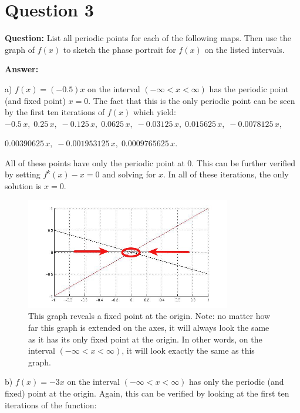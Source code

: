 \documentclass[12pt]{article}
\newenvironment{myenv}{\begin{adjustwidth}{1cm}{}}{\end{adjustwidth}}
\begin{document}
\section*{Question 3}
\begin{myenv}
\textbf{Question:} List all periodic points for each of the following maps. Then use the graph of $f(x)$ to sketch the phase portrait for $f(x)$ on the listed intervals.

\textbf{Answer:} 

a) $f(x) = (-0.5)x$ on the interval $(-\infty < x < \infty)$ has the periodic point (and fixed point) $x = 0$. The fact that this is the only periodic point can be seen by the first ten iterations of $f(x)$ which yield: \\

 $- 0.5\, x,\; 0.25\, x,\; - 0.125\, x,\; 0.0625\, x,\;- 0.03125\, x,\; 0.015625\, x,\; - 0.0078125\, x,\;$
 
 $0.00390625\, x,\; - 0.001953125\, x,\; 0.0009765625\, x$.
 
 All of these points have only the periodic point at 0. This can be further verified by setting $f^k(x) - x = 0$ and solving for $x$. In all of these iterations, the only solution is $x = 0$.

\begin{figure} [H]
    \centering
    \includegraphics[width=0.8\textwidth]{2_3a}
    \caption{This graph reveals a fixed point at the origin. Note: no matter how far this graph is extended on the axes, it will always look the same as it has its only fixed point at the origin. In other words, on the interval $(-\infty < x < \infty)$, it will look exactly the same as this graph. }
    \label{figure:a4}
\end{figure}

b) $f(x) = -3x$ on the interval $(-\infty < x < \infty)$ has only the periodic (and fixed) point at the origin. Again, this can be verified by looking at the first ten iterations of the function:


\end{myenv}
\end{document}
